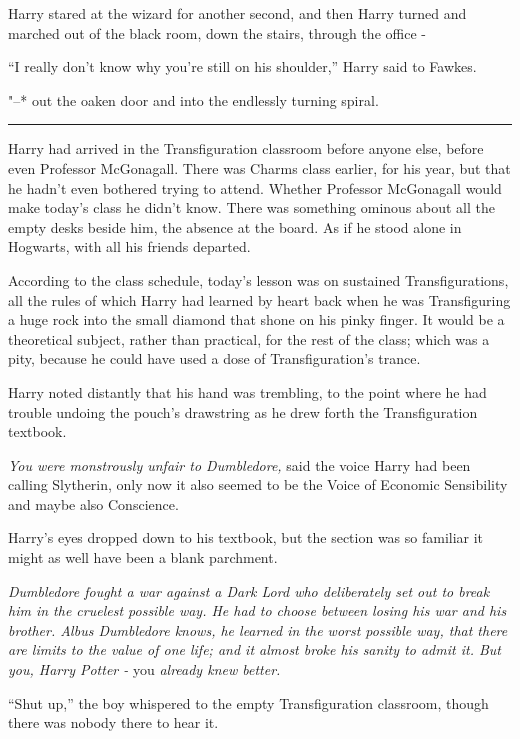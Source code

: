 Harry stared at the wizard for another second, and then Harry turned and
marched out of the black room, down the stairs, through the office -

``I really don't know why you're still on his shoulder,'' Harry said to
Fawkes.

"--* out the oaken door and into the endlessly turning spiral.

\begin{center}\rule{3in}{0.4pt}\end{center}

Harry had arrived in the Transfiguration classroom before anyone else,
before even Professor McGonagall. There was Charms class earlier, for
his year, but that he hadn't even bothered trying to attend. Whether
Professor McGonagall would make today's class he didn't know. There was
something ominous about all the empty desks beside him, the absence at
the board. As if he stood alone in Hogwarts, with all his friends
departed.

According to the class schedule, today's lesson was on sustained
Transfigurations, all the rules of which Harry had learned by heart back
when he was Transfiguring a huge rock into the small diamond that shone
on his pinky finger. It would be a theoretical subject, rather than
practical, for the rest of the class; which was a pity, because he could
have used a dose of Transfiguration's trance.

Harry noted distantly that his hand was trembling, to the point where he
had trouble undoing the pouch's drawstring as he drew forth the
Transfiguration textbook.

\emph{You were monstrously unfair to Dumbledore,} said the voice Harry
had been calling Slytherin, only now it also seemed to be the Voice of
Economic Sensibility and maybe also Conscience.

Harry's eyes dropped down to his textbook, but the section was so
familiar it might as well have been a blank parchment.

\emph{Dumbledore fought a war against a Dark Lord who deliberately set
out to break him in the cruelest possible way. He had to choose between
losing his war and his brother. Albus Dumbledore knows, he learned in
the worst possible way, that there are limits to the value of one life;
and it almost broke his sanity to admit it. But you, Harry Potter -} you
\emph{already knew better.}

``Shut up,'' the boy whispered to the empty Transfiguration classroom,
though there was nobody there to hear it.

